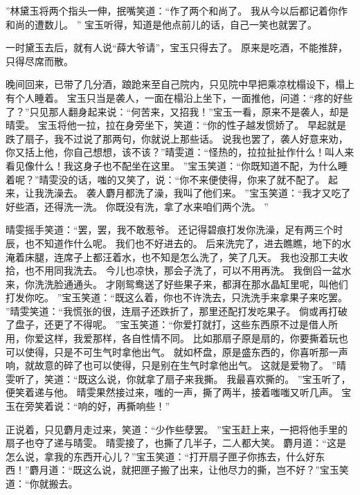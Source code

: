 ”林黛玉将两个指头一伸，抿嘴笑道：“作了两个和尚了。
我从今以后都记着你作和尚的遭数儿。
”
宝玉听得，知道是他点前儿的话，自己一笑也就罢了。
\par
一时黛玉去后，就有人说“薛大爷请”，宝玉只得去了。
原来是吃酒，不能推辞，只得尽席而散。
\par
晚间回来，已带了几分酒，踉跄来至自己院内，只见院中早把乘凉枕榻设下，榻上有个人睡着。
宝玉只当是袭人，一面在榻沿上坐下，一面推他，问道：“疼的好些了？”只见那人翻身起来说：“何苦来，又招我！”宝玉一看，原来不是袭人，却是晴雯。
宝玉将他一拉，拉在身旁坐下，笑道：“你的性子越发惯娇了。
早起就是跌了扇子，我不过说了那两句，你就说上那些话。
说我也罢了，袭人好意来劝，你又括上他，你自己想想，该不该？”晴雯道：“怪热的，拉拉扯扯作什么！叫人来看见像什么！我这身子也不配坐在这里。
”宝玉笑道：“你既知道不配，为什么睡着呢？”晴雯没的话，嗤的又笑了，说：“你不来便使得，你来了就不配了。
起来，让我洗澡去。
袭人麝月都洗了澡，我叫了他们来。
”宝玉笑道：“我才又吃了好些酒，还得洗一洗。
你既没有洗，拿了水来咱们两个洗。
”\par
晴雯摇手笑道：“罢，罢，我不敢惹爷。
还记得碧痕打发你洗澡，足有两三个时辰，也不知道作什么呢。
我们也不好进去的。
后来洗完了，进去瞧瞧，地下的水淹着床腿，连席子上都汪着水，也不知是怎么洗了，笑了几天。
我也没那工夫收拾，也不用同我洗去。
今儿也凉快，那会子洗了，可以不用再洗。
我倒舀一盆水来，你洗洗脸通通头。
才刚鸳鸯送了好些果子来，都湃在那水晶缸里呢，叫他们打发你吃。
”宝玉笑道：“既这么着，你也不许洗去，只洗洗手来拿果子来吃罢。
”晴雯笑道：“我慌张的很，连扇子还跌折了，那里还配打发吃果子。
倘或再打破了盘子，还更了不得呢。
”宝玉笑道：“你爱打就打，这些东西原不过是借人所用，你爱这样，我爱那样，各自性情不同。
比如那扇子原是扇的，你要撕着玩也可以使得，只是不可生气时拿他出气。
就如杯盘，原是盛东西的，你喜听那一声响，就故意的碎了也可以使得，只是别在生气时拿他出气。
这就是爱物了。
”晴雯听了，笑道：“既这么说，你就拿了扇子来我撕。
我最喜欢撕的。
”宝玉听了，便笑着递与他。
晴雯果然接过来，嗤的一声，撕了两半，接着嗤嗤又听几声。
宝玉在旁笑着说：“响的好，再撕响些！”\par
正说着，只见麝月走过来，笑道：“少作些孽罢。
”宝玉赶上来，一把将他手里的扇子也夺了递与晴雯。
晴雯接了，也撕了几半子，二人都大笑。
麝月道：“这是怎么说，拿我的东西开心儿？”宝玉笑道：“打开扇子匣子你拣去，什么好东西！”麝月道：“既这么说，就把匣子搬了出来，让他尽力的撕，岂不好？”宝玉笑道：“你就搬去。
